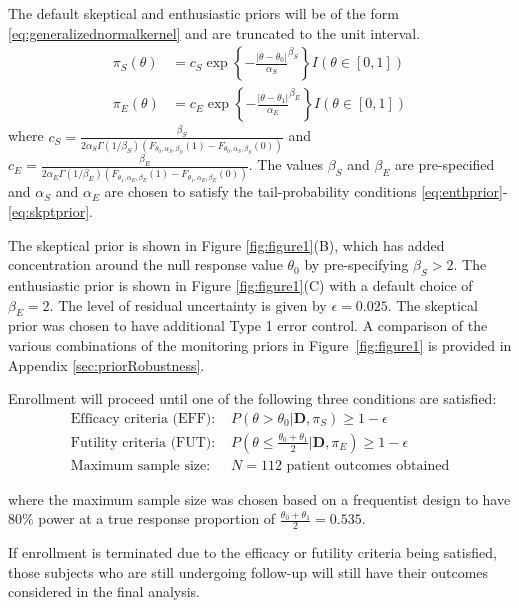 \documentclass[12pt]{article}
\begin{document}
The default skeptical and enthusiastic priors will be of the form \eqref{eq:generalizednormalkernel} and are truncated to the unit interval. 
\begin{align}
\pi_S(\theta)&=c_S \exp\left\{-\frac{|\theta-\theta_0|}{\alpha_S}^{\beta_S}\right\}{I(\theta\in[0,1])} \label{eq:ex1skptprior}\\
\pi_E(\theta)&=c_E\exp\left\{-\frac{|\theta-\theta_1|}{\alpha_E}^{\beta_E}\right\}{I(\theta\in[0,1])}\label{eq:ex1enthprior}
\end{align}
where $c_S=\frac{\beta_S}{2\alpha_S \Gamma(1/\beta_S)({F_{\theta_0,\alpha_S,\beta_S}(1)-F_{\theta_0,\alpha_S,\beta_S}(0)})}$ and $c_E=\frac{\beta_E}{2\alpha_E \Gamma(1/\beta_E)({F_{\theta_1,\alpha_E,\beta_E}(1)-F_{\theta_1,\alpha_E,\beta_E}(0)})}$. The values $\beta_S$ and $\beta_E$ are pre-specified and $\alpha_S$ and $\alpha_E$ are chosen to satisfy the tail-probability conditions 
\eqref{eq:enthprior}-\eqref{eq:skptprior}.

The skeptical prior is shown in Figure \ref{fig:figure1}(B), which has added concentration around the null response value $\theta_0$ by pre-specifying $\beta_S>2$. The enthusiastic prior is shown in Figure \ref{fig:figure1}(C) with a default choice of $\beta_E=2$. The level of residual uncertainty is given by $\epsilon=0.025$. The skeptical prior was chosen to have additional Type 1 error control. A comparison of the various combinations of the monitoring priors in Figure~\ref{fig:figure1} is provided in Appendix \ref{sec:priorRobustness}.

Enrollment will proceed until one of the following three conditions are satisfied:
\begin{align}
\text{Efficacy criteria (EFF): }&P(\theta>\theta_0|\mathbf{D},\pi_S)\geq 1-\epsilon \label{eq:ex1efficacy}\\
\text{Futility criteria (FUT): }&P\left(\theta\leq\frac{\theta_0+\theta_1}{2} \Big|\mathbf{D},\pi_E\right)\geq 1-\epsilon \label{eq:ex1futility}\\
\text{Maximum sample size: }&N=112 \text{ patient outcomes obtained}\label{eq:ex1maxss}
\end{align}

where the maximum sample size was chosen based on a frequentist design to have $80\%$ power at a true response proportion of $\frac{\theta_0+\theta_1}{2}=0.535$.

If enrollment is terminated due to the efficacy or futility criteria being satisfied, those subjects who are still undergoing follow-up will still have their outcomes considered in the final analysis.
\end{document}
